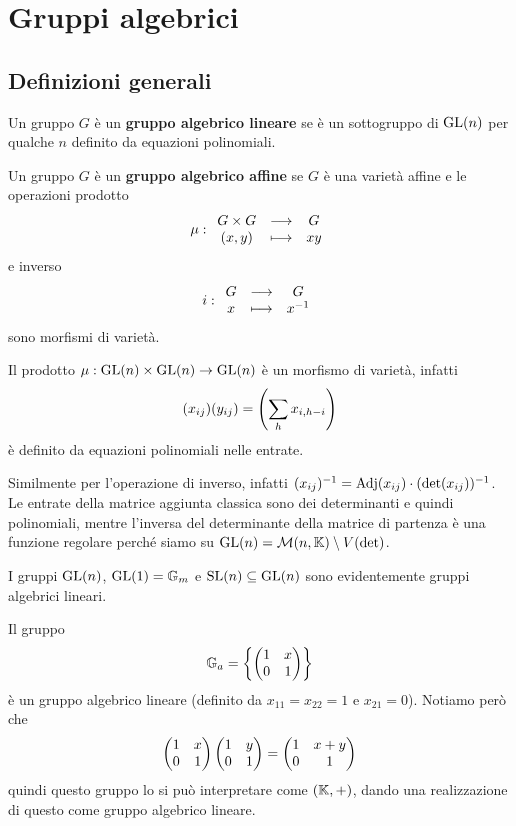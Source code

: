 \chapter{Gruppi algebrici}

\section{Definizioni generali}
\begin{definition}
Un gruppo $G$ \`e un \textbf{gruppo algebrico lineare} se \`e un sottogruppo di $\mathrm{GL}(n)$ per qualche $n$ definito da equazioni polinomiali.
\end{definition}

\begin{definition}
Un gruppo $G$ \`e un \textbf{gruppo algebrico affine} se $G$ \`e una variet\`a affine e le operazioni prodotto
\[\mu:\begin{array}{ccc} {G\times G} & \longrightarrow & {G}\\ {(x,y)} & \longmapsto & {xy} \end{array}\]
e inverso
\[i:\begin{array}{ccc} {G} & \longrightarrow & {G}\\ {x} & \longmapsto & {x^{-1}} \end{array}\]
sono morfismi di variet\`a.
\end{definition}

\begin{remark}
Il prodotto $\mu:\mathrm{GL}(n)\times\mathrm{GL}(n)\to\mathrm{GL}(n)$ \`e un morfismo di variet\`a, infatti
\[(x_{ij})(y_{ij})=\left({\sum_h x_{i,h-i}}\right)\]
\`e definito da equazioni polinomiali nelle entrate.

Similmente per l'operazione di inverso, infatti $(x_{ij})^{-1}=\operatorname{Adj}(x_{ij})\cdot (\det(x_{ij}))^{-1}$. Le entrate della matrice aggiunta classica sono dei determinanti e quindi polinomiali, mentre l'inversa del determinante della matrice di partenza \`e una funzione regolare perch\'e siamo su $\mathrm{GL}(n)=\mathcal{M}(n,\mathbb{K})\setminus V(\det)$.
\end{remark}

\begin{example}
I gruppi $\mathrm{GL}(n)$, $\mathrm{GL}(1)=\mathbb{G}_m$ e $\mathrm{SL}(n)\subseteq \mathrm{GL}(n)$ sono evidentemente gruppi algebrici lineari.
\end{example}

\begin{example}
Il gruppo
\[\mathbb{G}_a=\left\{{\begin{pmatrix}1&x\\0&1\end{pmatrix}}\right\}\]
\`e un gruppo algebrico lineare (definito da $x_{11}=x_{22}=1$ e $x_{21}=0$). Notiamo per\`o che
\[\begin{pmatrix}1&x\\0&1\end{pmatrix}\begin{pmatrix}1&y\\0&1\end{pmatrix}=\begin{pmatrix}1&x+y\\0&1\end{pmatrix}\]
quindi questo gruppo lo si pu\`o interpretare come $(\mathbb{K},+)$, dando una realizzazione di questo come gruppo algebrico lineare.
\end{example}

